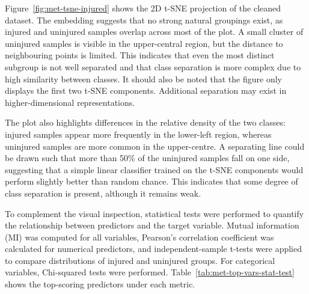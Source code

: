 Figure~\ref{fig:met-tsne-injured} shows the 2D t-SNE projection of the cleaned dataset. The embedding suggests that no strong natural groupings exist, as injured and uninjured samples overlap across most of the plot. A small cluster of uninjured samples is visible in the upper-central region, but the distance to neighbouring points is limited. This indicates that even the most distinct subgroup is not well separated and that class separation is more complex due to high similarity between classes. It should also be noted that the figure only displays the first two t-SNE components. Additional separation may exist in higher-dimensional representations.

The plot also highlights differences in the relative density of the two classes: injured samples appear more frequently in the lower-left region, whereas uninjured samples are more common in the upper-centre. A separating line could be drawn such that more than 50\% of the uninjured samples fall on one side, suggesting that a simple linear classifier trained on the t-SNE components would perform slightly better than random chance. This indicates that some degree of class separation is present, although it remains weak.

To complement the visual inspection, statistical tests were performed to quantify the relationship between predictors and the target variable. Mutual information (MI) was computed for all variables, Pearson's correlation coefficient was calculated for numerical predictors, and independent-sample t-tests were applied to compare distributions of injured and uninjured groups. For categorical variables, Chi-squared tests were performed. Table~\ref{tab:met-top-vars-stat-test} shows the top-scoring predictors under each metric.

